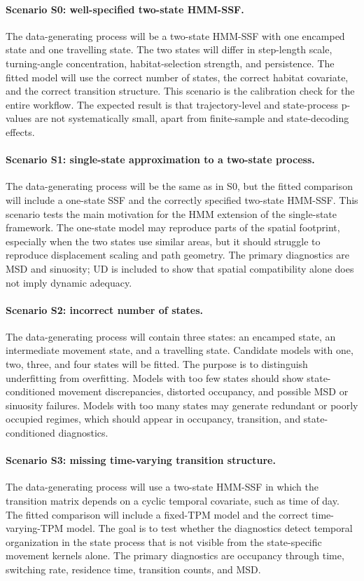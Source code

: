 \documentclass[11pt]{article}
\begin{document}
\FloatBarrier

\paragraph{Scenario S0: well-specified two-state HMM-SSF.}
The data-generating process will be a two-state HMM-SSF with one encamped state
and one travelling state. The two states will differ in step-length scale,
turning-angle concentration, habitat-selection strength, and persistence. The
fitted model will use the correct number of states, the correct habitat
covariate, and the correct transition structure. This scenario is the
calibration check for the entire workflow. The expected result is that
trajectory-level and state-process p-values are not systematically small,
apart from finite-sample and state-decoding effects.

\paragraph{Scenario S1: single-state approximation to a two-state process.}
The data-generating process will be the same as in S0, but the fitted
comparison will include a one-state SSF and the correctly specified two-state
HMM-SSF. This scenario tests the main motivation for the HMM extension of the
single-state framework. The one-state model may reproduce parts of the spatial
footprint, especially when the two states use similar areas, but it should
struggle to reproduce displacement scaling and path geometry. The primary
diagnostics are MSD and sinuosity; UD is included to show that spatial
compatibility alone does not imply dynamic adequacy.

\paragraph{Scenario S2: incorrect number of states.}
The data-generating process will contain three states: an encamped state, an
intermediate movement state, and a travelling state. Candidate models with one,
two, three, and four states will be fitted. The purpose is to distinguish
underfitting from overfitting. Models with too few states should show
state-conditioned movement discrepancies, distorted occupancy, and possible
MSD or sinuosity failures. Models with too many states may generate redundant
or poorly occupied regimes, which should appear in occupancy, transition, and
state-conditioned diagnostics.

\paragraph{Scenario S3: missing time-varying transition structure.}
The data-generating process will use a two-state HMM-SSF in which the
transition matrix depends on a cyclic temporal covariate, such as time of day.
The fitted comparison will include a fixed-TPM model and the correct
time-varying-TPM model. The goal is to test whether the diagnostics detect
temporal organization in the state process that is not visible from the
state-specific movement kernels alone. The primary diagnostics are occupancy
through time, switching rate, residence time, transition counts, and MSD.
\end{document}
